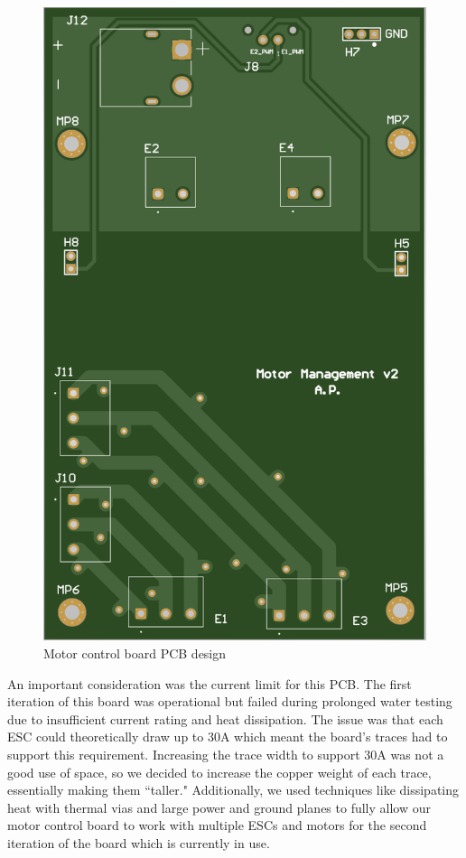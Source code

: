 \documentclass[conference]{IEEEtran}
\begin{document}
\begin{figure}[htbp]
    \centerline{\includegraphics[scale=0.3]{images/motor_pcb.png}}
    \caption{Motor control board PCB design}
    \label{fig:motor_pcb}
\end{figure}

An important consideration was the current limit for this PCB. The first iteration of this board was operational but failed during prolonged water testing due to insufficient current rating and heat dissipation. The issue was that each ESC could theoretically draw up to 30A which meant the board’s traces had to support this requirement. Increasing the trace width to support 30A was not a good use of space, so we decided to increase the copper weight of each trace, essentially making them ``taller." Additionally, we used techniques like dissipating heat with thermal vias and large power and ground planes to fully allow our motor control board to work with multiple ESCs and motors for the second iteration of the board which is currently in use.
\end{document}
